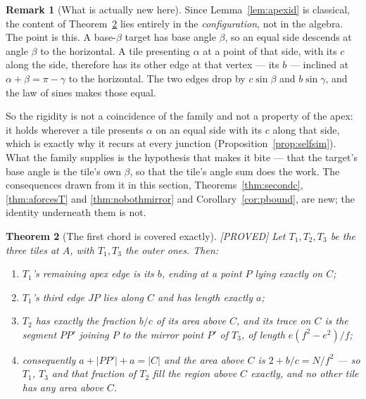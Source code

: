 \documentclass[11pt,reqno]{amsart}
\theoremstyle{plain}
\newtheorem{theorem}{Theorem}
\theoremstyle{definition}
\newtheorem{remark}[theorem]{Remark}
\newcommand{\lab}[1]{\hfill\textnormal{\footnotesize\textsc{[#1]}}}
\begin{document}
\begin{remark}[What is actually new here]\label{rem:apexnovelty}
Since Lemma~\ref{lem:apexid} is classical, the content of Theorem~\ref{thm:apexconfig} lies entirely in
the \emph{configuration}, not in the algebra. The point is this. A base-$\beta$ target has base angle
$\beta$, so an equal side descends at angle $\beta$ to the horizontal. A tile presenting $\alpha$ at a
point of that side, with its $c$ along the side, therefore has its other edge at that vertex --- its
$b$ --- inclined at $\alpha+\beta=\pi-\gamma$ to the horizontal. The two edges drop by $c\sin\beta$ and
$b\sin\gamma$, and the law of sines makes those equal.

So the rigidity is not a coincidence of the family and not a property of the apex: it holds wherever a
tile presents $\alpha$ on an equal side with its $c$ along that side, which is exactly why it recurs at
every junction (Proposition~\ref{prop:selfsim}). What the family supplies is the hypothesis that makes
it bite --- that the target's base angle is the tile's own $\beta$, so that the tile's angle sum does
the work. The consequences drawn from it in this section, Theorems~\ref{thm:secondc},
\ref{thm:aforcesT} and \ref{thm:nobothmirror} and Corollary~\ref{cor:pbound}, are new; the identity
underneath them is not.
\end{remark}

\begin{theorem}[The first chord is covered exactly]\label{thm:apexconfig}\lab{PROVED}
Let $T_1,T_2,T_3$ be the three tiles at $A$, with $T_1,T_3$ the outer ones. Then:
\begin{enumerate}
\item[(a)] $T_1$'s remaining apex edge is its $b$, ending at a point $P$ lying \emph{exactly} on $C$;
\item[(b)] $T_1$'s third edge $JP$ lies \emph{along} $C$ and has length exactly $a$;
\item[(c)] $T_2$ has exactly the fraction $b/c$ of its area above $C$, and its trace on $C$ is the
segment $PP'$ joining $P$ to the mirror point $P'$ of $T_3$, of length $e(f^{2}-e^{2})/f$;
\item[(d)] consequently $a+|PP'|+a=|C|$ and the area above $C$ is $2+b/c=N/f^{2}$ --- so $T_1$, $T_3$
and that fraction of $T_2$ fill the region above $C$ \emph{exactly}, and no other tile has any area
above $C$.
\end{enumerate}
\end{theorem}
\end{document}
